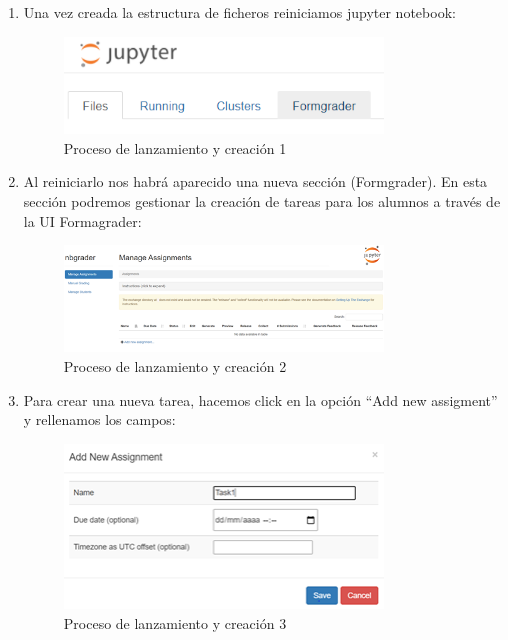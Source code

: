 \begin{enumerate}
\item Una vez creada la estructura de ficheros reiniciamos jupyter notebook:	

\begin{figure}[H]
    \centering
    \includegraphics[width=0.8\textwidth]{img/prueba/prueba_1.png}
    \caption{Proceso de lanzamiento y creación 1}
\end{figure}

\item Al reiniciarlo nos habrá aparecido una nueva sección (Formgrader). En esta sección podremos gestionar la creación de tareas para los alumnos a través de la UI Formagrader:

\begin{figure}[H]
    \centering
    \includegraphics[width=0.8\textwidth]{img/prueba/prueba_2.png}
    \caption{Proceso de lanzamiento y creación 2}
\end{figure}

\item Para crear una nueva tarea, hacemos click en la opción “Add new assigment” y rellenamos los campos:

\begin{figure}[H]
    \centering
    \includegraphics[width=0.8\textwidth]{img/prueba/prueba_3.png}
    \caption{Proceso de lanzamiento y creación 3}
\end{figure}


\end{enumerate}
